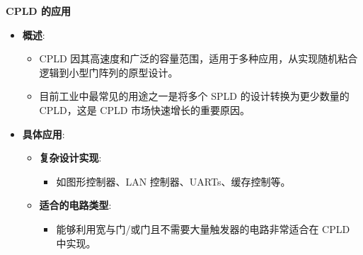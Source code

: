 \documentclass[
  ignorenonframetext,
  chinese,
]{beamer}
\providecommand{\tightlist}{%
  \setlength{\itemsep}{0pt}\setlength{\parskip}{0pt}}
\begin{document}
\begin{frame}
\begin{block}{\textbf{CPLD 的应用}}
\label{cpld-ux7684ux5e94ux7528}
\begin{itemize}
\tightlist
\item
  \textbf{概述}:

  \begin{itemize}
  \tightlist
  \item
    CPLD
    因其高速度和广泛的容量范围，适用于多种应用，从实现随机粘合逻辑到小型门阵列的原型设计。
  \item
    目前工业中最常见的用途之一是将多个 SPLD 的设计转换为更少数量的
    CPLD，这是 CPLD 市场快速增长的重要原因。
  \end{itemize}
\item
  \textbf{具体应用}:

  \begin{itemize}
  \tightlist
  \item
    \textbf{复杂设计实现}:

    \begin{itemize}
    \tightlist
    \item
      如图形控制器、LAN 控制器、UARTs、缓存控制等。
    \end{itemize}
  \item
    \textbf{适合的电路类型}:

    \begin{itemize}
    \tightlist
  \item
      能够利用宽与门/或门且不需要大量触发器的电路非常适合在 CPLD
      中实现。
    \end{itemize}
  \end{itemize}
\end{itemize}
\end{block}
\end{frame}
\end{document}
